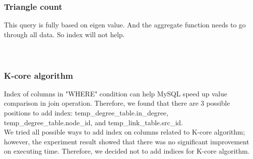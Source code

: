 \subsubsection{Triangle count}

This query is fully based on eigen value. And the aggregate function needs to go through all data. So index will not help.\\
\\
 \\

\subsubsection{K-core algorithm}

Index of columns in "WHERE" condition can help MySQL speed up value comparison in join operation. Therefore, we found that there are 3 possible positions to add index: temp\_degree\_table.in\_degree, temp\_degree\_table.node\_id, and temp\_link\_table.src\_id.
\\
We tried all possible ways to add index on columns related to K-core algorithm; however, the experiment result showed that there was no significant improvement on executing time. Therefore, we decided not to add indices for K-core algorithm.

